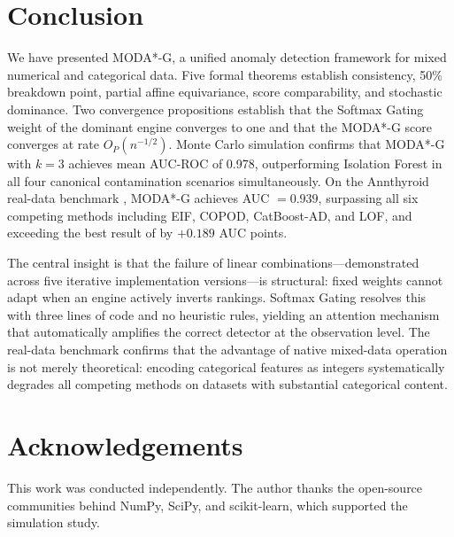 \documentclass[11pt]{article}
\theoremstyle{plain}
\theoremstyle{definition}
\begin{document}
\section{Conclusion}
\label{sec:conclusion}

We have presented MODA*-G, a unified anomaly detection
framework for mixed numerical and categorical data.
Five formal theorems establish consistency, 50\%
breakdown point, partial affine equivariance, score
comparability, and stochastic dominance.
Two convergence propositions establish that the Softmax
Gating weight of the dominant engine converges to one
and that the MODA*-G score converges at rate
$O_P(n^{-1/2})$.
Monte Carlo simulation confirms that MODA*-G with $k=3$
achieves mean AUC-ROC of 0.978, outperforming Isolation
Forest in all four canonical contamination scenarios
simultaneously. On the Annthyroid real-data benchmark
\citep{campos2016}, MODA*-G achieves AUC $= 0.939$,
surpassing all six competing methods including EIF,
COPOD, CatBoost-AD, and LOF, and exceeding the best
result of \citet{campos2016} by $+0.189$ AUC points.

The central insight is that the failure of linear
combinations---demonstrated across five iterative
implementation versions---is structural: fixed weights
cannot adapt when an engine actively inverts rankings.
Softmax Gating resolves this with three lines of code
and no heuristic rules, yielding an attention mechanism
that automatically amplifies the correct detector at
the observation level. The real-data benchmark confirms
that the advantage of native mixed-data operation is
not merely theoretical: encoding categorical features
as integers systematically degrades all competing
methods on datasets with substantial categorical content.

\section*{Acknowledgements}
This work was conducted independently. The author thanks
the open-source communities behind NumPy, SciPy, and
scikit-learn, which supported the simulation study.
\end{document}
